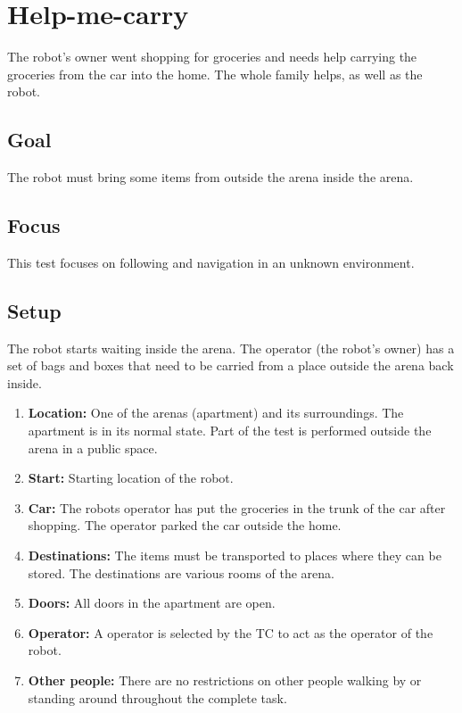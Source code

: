 \section{Help-me-carry}
The robot's owner went shopping for groceries and needs help carrying the groceries from the car into the home.
The whole family helps, as well as the robot. 

\subsection{Goal}
The robot must bring some items from outside the arena inside the arena.

\subsection{Focus}
This test focuses on following and navigation in an unknown environment. 

\subsection{Setup}
The robot starts waiting inside the arena. 
The operator (the robot's owner) has a set of bags and boxes that need to be carried from a place outside the arena back inside. 

\begin{enumerate}
  \item \textbf{Location:} One of the arenas (apartment) and its surroundings. The apartment is in its normal state. Part of the test is performed outside the arena in a public space.
  \item \textbf{Start:} Starting location of the robot. %
  \item \textbf{Car:} The robots operator has put the groceries in the trunk of the car after shopping. The operator parked the car outside the home.
  \item \textbf{Destinations:} The items must be transported to places where they can be stored. The destinations are various rooms of the arena. 
  \item \textbf{Doors:} All doors in the apartment are open.
  \item \textbf{Operator:} A  operator is selected by the TC to act as the operator of the robot. 
  \item \textbf{Other people:} There are no restrictions on other people walking by or standing around throughout the complete task. 
\end{enumerate}

